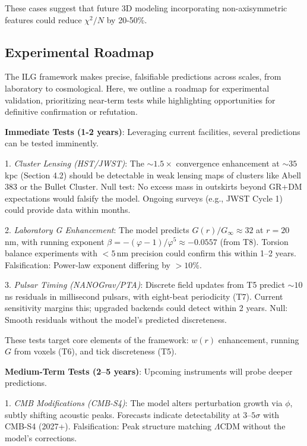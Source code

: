 \documentclass[12pt,a4paper]{article}
\begin{document}
These cases suggest that future 3D modeling incorporating non-axisymmetric features could reduce $\chi^2/N$ by 20-50\%.

\subsection{Experimental Roadmap}

The ILG framework makes precise, falsifiable predictions across scales, from laboratory to cosmological. Here, we outline a roadmap for experimental validation, prioritizing near-term tests while highlighting opportunities for definitive confirmation or refutation.

\textbf{Immediate Tests (1-2 years)}: Leveraging current facilities, several predictions can be tested imminently.

1. \emph{Cluster Lensing (HST/JWST)}: The $\sim 1.5\times$ convergence enhancement at $\sim 35$\,kpc (Section 4.2) should be detectable in weak lensing maps of clusters like Abell 383 or the Bullet Cluster. Null test: No excess mass in outskirts beyond GR+DM expectations would falsify the model. Ongoing surveys (e.g., JWST Cycle 1) could provide data within months.

2. \emph{Laboratory G Enhancement}: The model predicts $G(r)/G_\infty \approx 32$ at $r=20$\,nm, with running exponent $\beta = -(\varphi-1)/\varphi^5 \approx -0.0557$ (from T8). Torsion balance experiments with $<5$\,nm precision could confirm this within 1--2 years. Falsification: Power-law exponent differing by $>10\%$.

3. \emph{Pulsar Timing (NANOGrav/PTA)}: Discrete field updates from T5 predict $\sim 10$\,ns residuals in millisecond pulsars, with eight-beat periodicity (T7). Current sensitivity margins this; upgraded backends could detect within 2 years. Null: Smooth residuals without the model's predicted discreteness.

These tests target core elements of the framework: $w(r)$ enhancement, running $G$ from voxels (T6), and tick discreteness (T5).

\textbf{Medium-Term Tests (2--5 years)}: Upcoming instruments will probe deeper predictions.

1. \emph{CMB Modifications (CMB-S4)}: The model alters perturbation growth via $\phi$, subtly shifting acoustic peaks. Forecasts indicate detectability at $3$--$5\sigma$ with CMB-S4 (2027+). Falsification: Peak structure matching $\Lambda$CDM without the model's corrections.
\end{document}
